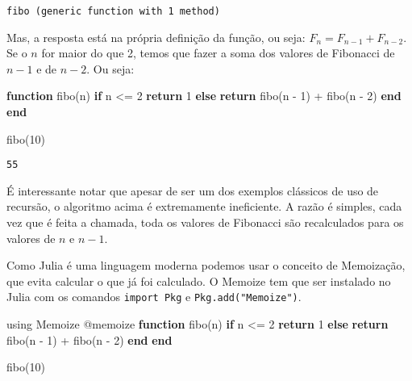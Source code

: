 \documentclass[
  letterpaper,
  DIV=11,
  numbers=noendperiod]{scrreprt}
\newenvironment{Shaded}{\begin{snugshade}}{\end{snugshade}}
\newcommand{\BuiltInTok}[1]{\textcolor[rgb]{0.00,0.23,0.31}{#1}}
\newcommand{\ControlFlowTok}[1]{\textcolor[rgb]{0.00,0.23,0.31}{\textbf{#1}}}
\newcommand{\FloatTok}[1]{\textcolor[rgb]{0.68,0.00,0.00}{#1}}
\newcommand{\FunctionTok}[1]{\textcolor[rgb]{0.28,0.35,0.67}{#1}}
\newcommand{\ImportTok}[1]{\textcolor[rgb]{0.00,0.46,0.62}{#1}}
\newcommand{\KeywordTok}[1]{\textcolor[rgb]{0.00,0.23,0.31}{\textbf{#1}}}
\newcommand{\NormalTok}[1]{\textcolor[rgb]{0.00,0.23,0.31}{#1}}
\newcommand{\OperatorTok}[1]{\textcolor[rgb]{0.37,0.37,0.37}{#1}}
\newcommand{\PreprocessorTok}[1]{\textcolor[rgb]{0.68,0.00,0.00}{#1}}
\begin{document}
\begin{verbatim}
fibo (generic function with 1 method)
\end{verbatim}

Mas, a resposta está na própria definição da função, ou seja:
\(F_n = F_{n-1} +  F_{n-2}\). Se o \(n\) for maior do que 2, temos que
fazer a soma dos valores de Fibonacci de \(n-1\) e de \(n-2\). Ou seja:

\begin{Shaded}
\begin{Highlighting}[]
\KeywordTok{function} \FunctionTok{fibo}\NormalTok{(n)}
    \ControlFlowTok{if}\NormalTok{ n }\OperatorTok{\textless{}=} \FloatTok{2}
        \ControlFlowTok{return} \FloatTok{1}
    \ControlFlowTok{else}
        \ControlFlowTok{return} \FunctionTok{fibo}\NormalTok{(n }\OperatorTok{{-}} \FloatTok{1}\NormalTok{) }\OperatorTok{+} \FunctionTok{fibo}\NormalTok{(n }\OperatorTok{{-}} \FloatTok{2}\NormalTok{)}
    \ControlFlowTok{end}
\KeywordTok{end}

\FunctionTok{fibo}\NormalTok{(}\FloatTok{10}\NormalTok{)}
\end{Highlighting}
\end{Shaded}

\begin{verbatim}
55
\end{verbatim}

É interessante notar que apesar de ser um dos exemplos clássicos de uso
de recursão, o algoritmo acima é extremamente ineficiente. A razão é
simples, cada vez que é feita a chamada, toda os valores de Fibonacci
são recalculados para os valores de \(n\) e \(n-1\).

Como Julia é uma linguagem moderna podemos usar o conceito de
Memoização, que evita calcular o que já foi calculado. O Memoize tem que
ser instalado no Julia com os comandos \texttt{import\ Pkg} e
\texttt{Pkg.add("Memoize")}.

\begin{Shaded}
\begin{Highlighting}[]
\ImportTok{using} \BuiltInTok{Memoize}
\PreprocessorTok{@memoize} \KeywordTok{function} \FunctionTok{fibo}\NormalTok{(n)}
    \ControlFlowTok{if}\NormalTok{ n }\OperatorTok{\textless{}=} \FloatTok{2}
        \ControlFlowTok{return} \FloatTok{1}
    \ControlFlowTok{else}
        \ControlFlowTok{return} \FunctionTok{fibo}\NormalTok{(n }\OperatorTok{{-}} \FloatTok{1}\NormalTok{) }\OperatorTok{+} \FunctionTok{fibo}\NormalTok{(n }\OperatorTok{{-}} \FloatTok{2}\NormalTok{)}
    \ControlFlowTok{end}
\KeywordTok{end}

\FunctionTok{fibo}\NormalTok{(}\FloatTok{10}\NormalTok{)}
\end{Highlighting}
\end{Shaded}
\end{document}
